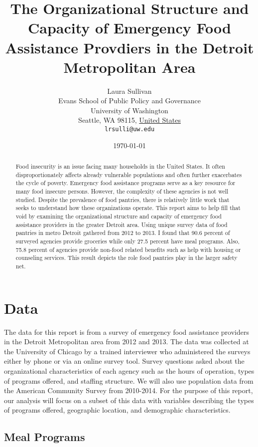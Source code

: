 \documentclass[11pt]{article}
\title{The Organizational Structure and Capacity of Emergency Food Assistance Provdiers in the Detroit Metropolitan Area}
\author{
        Laura Sullivan\\
        Evans School of Public Policy and Governance\\
        University of Washington\\
        Seattle, WA 98115, \underline{United States}\\
        \texttt{lrsulli@uw.edu}
}
\date{\today}
\begin{document}


\maketitle


\begin{abstract}
Food insecurity is an issue facing many households in the United States. It often disproportionately affects already vulnerable populations and often further exacerbates the cycle of poverty. Emergency food assistance programs serve as a key resource for many food insecure persons. However, the complexity of these agencies is not well studied. Despite the prevalence of food pantries, there is relatively little work that seeks to understand how these organizations operate. This report aims to help fill that void by examining the organizational structure and capacity of emergency food assistance providers in the greater Detroit area. Using unique survey data of food pantries in metro Detroit gathered from 2012 to 2013. I found that 90.6 percent of surveyed agencies provide groceries while only 27.5 percent have meal programs. Also, 75.8 percent of agencies provide non-food related benefits such as help with housing or counseling services. This result depicts the role food pantries play in the larger safety net.
\end{abstract}

\section{Data}\label{intro}
The data for this report is from a survey of emergency food assistance providers in the Detroit Metropolitan area from 2012 and 2013. The data was collected at the University of Chicago by a trained interviewer who administered the surveys either by phone or via an online survey tool. Survey questions asked about the organizational characteristics of each agency such as the hours of operation, types of programs offered, and staffing structure. We will also use population data from the American Community Survey from 2010-2014. For the purpose of this report, our analysis will focus on a subset of this data with variables describing the types of programs offered, geographic location, and demographic characteristics.


\subsection{Meal Programs}\label{eda}
\end{document}
